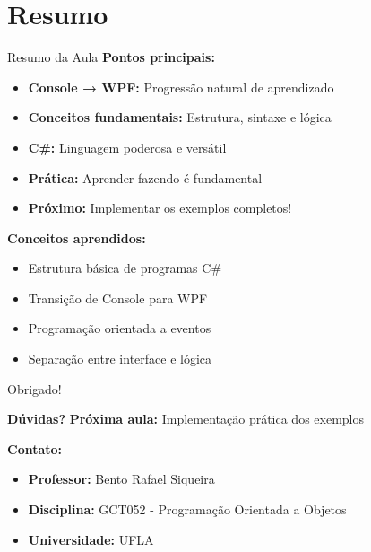\documentclass[aspectratio=169]{beamer}
\begin{document}
\section{Resumo}

\begin{frame}{Resumo da Aula}
\textbf{Pontos principais:}
\begin{itemize}
    \item \textbf{Console → WPF:} Progressão natural de aprendizado
    \item \textbf{Conceitos fundamentais:} Estrutura, sintaxe e lógica
    \item \textbf{C\#:} Linguagem poderosa e versátil
    \item \textbf{Prática:} Aprender fazendo é fundamental
    \item \textbf{Próximo:} Implementar os exemplos completos!
\end{itemize}

\textbf{Conceitos aprendidos:}
\begin{itemize}
    \item Estrutura básica de programas C\#
    \item Transição de Console para WPF
    \item Programação orientada a eventos
    \item Separação entre interface e lógica
\end{itemize}
\end{frame}

\begin{frame}{Obrigado!}
\begin{center}
\Large \textbf{Dúvidas?}
\vspace{1cm}
\normalsize
\textbf{Próxima aula:} Implementação prática dos exemplos
\end{center}

\textbf{Contato:}
\begin{itemize}
    \item \textbf{Professor:} Bento Rafael Siqueira
    \item \textbf{Disciplina:} GCT052 - Programação Orientada a Objetos
    \item \textbf{Universidade:} UFLA
\end{itemize}
\end{frame}
\end{document}
